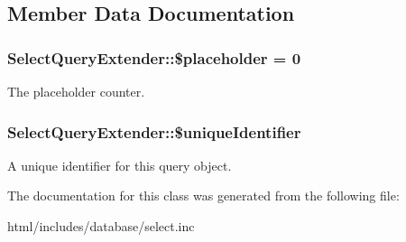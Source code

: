 \subsection{Member Data Documentation}
\hypertarget{classSelectQueryExtender_af063c51deb020592cb27a2412649afbe}{
\subsubsection[{\$placeholder}]{\setlength{\rightskip}{0pt plus 5cm}SelectQueryExtender::\$placeholder = 0}}
\label{classSelectQueryExtender_af063c51deb020592cb27a2412649afbe}
The placeholder counter. \hypertarget{classSelectQueryExtender_a3be2ced1063e8a4f60e85700755fb5b5}{
\subsubsection[{\$uniqueIdentifier}]{\setlength{\rightskip}{0pt plus 5cm}SelectQueryExtender::\$uniqueIdentifier}}
\label{classSelectQueryExtender_a3be2ced1063e8a4f60e85700755fb5b5}
A unique identifier for this query object. 

The documentation for this class was generated from the following file:\begin{DoxyCompactItemize}
\item 
html/includes/database/select.inc\end{DoxyCompactItemize}
